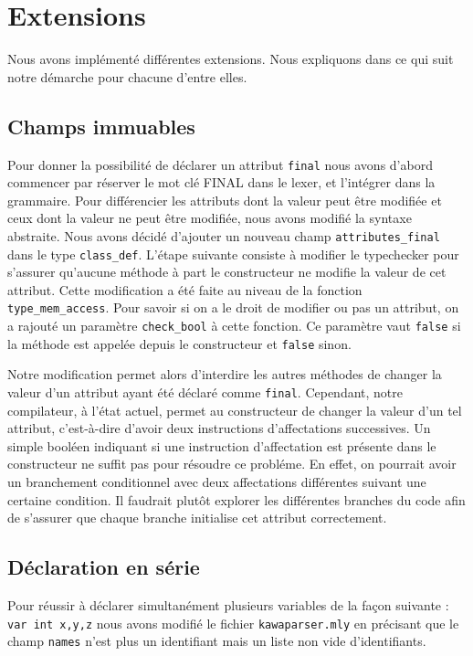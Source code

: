 \documentclass{article}
\begin{document}
\section{Extensions}
Nous avons implémenté différentes extensions. Nous expliquons dans ce qui suit notre démarche pour chacune d'entre elles.
\subsection{Champs immuables}
Pour donner la possibilité de déclarer un attribut \texttt{final} 
nous avons d'abord commencer par réserver le mot clé FINAL dans le lexer, et l'intégrer dans la grammaire.
Pour différencier les attributs dont la valeur peut être modifiée
et ceux dont la valeur ne peut être modifiée, nous avons modifié la syntaxe abstraite. 
Nous avons décidé d'ajouter un nouveau champ \texttt{attributes\_final} 
dans le type \texttt{class\_def}. L'étape suivante consiste à modifier le typechecker pour 
s'assurer qu'aucune méthode à part le constructeur ne modifie la valeur de cet attribut.
Cette modification a été faite au niveau de la fonction \texttt{type\_mem\_access}. Pour 
savoir si on a le droit de modifier ou pas un attribut, on a rajouté un paramètre \texttt{check\_bool}
à cette fonction. Ce paramètre vaut \texttt{false} si la méthode est appelée depuis le constructeur
et \texttt{false} sinon.

Notre modification permet alors d'interdire les autres méthodes de changer la valeur d'un attribut ayant été déclaré comme \texttt{final}.
Cependant, notre compilateur, à l'état actuel, permet au constructeur de changer la valeur d'un tel attribut, c'est-à-dire d'avoir 
deux instructions d'affectations successives. Un simple booléen indiquant si une instruction 
d'affectation est présente dans le constructeur ne suffit pas pour résoudre ce probléme.
En effet, on pourrait avoir un branchement conditionnel avec deux affectations différentes suivant 
une certaine condition. Il faudrait plutôt explorer les différentes branches du code afin 
de s'assurer que chaque branche initialise cet attribut correctement.

\subsection{Déclaration en série}
Pour réussir à déclarer simultanément plusieurs variables de la façon suivante : 
\texttt{var int x,y,z} nous avons modifié le fichier 
\texttt{kawaparser.mly} en précisant que le champ \texttt{names} 
n'est plus un identifiant mais un liste non vide d'identifiants.
\end{document}
